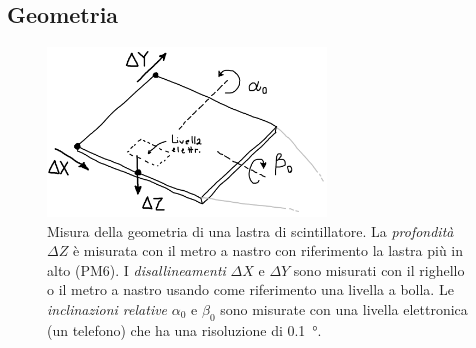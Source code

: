 \subsection{Geometria}

\begin{figure}
	\center
	\includegraphics[width=20em]{geometriamis}
	\caption{\label{fig:geometriamis}
	Misura della geometria di una lastra di scintillatore.
	La \emph{profondità} $\Delta Z$ è misurata con il metro a nastro
	con riferimento la lastra più in alto (PM6).
	I \emph{disallineamenti} $\Delta X$ e $\Delta Y$ sono misurati
	con il righello o il metro a nastro usando come riferimento
	una livella a bolla.
	Le \emph{inclinazioni relative} $\alpha_0$ e $\beta_0$ sono misurate con
	una livella elettronica (un telefono) che ha una risoluzione di \SI{0.1}{\degree}.}
\end{figure}

